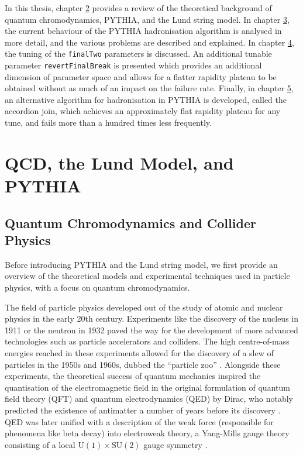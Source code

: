 \documentclass[12pt,a4paper]{report}
\begin{document}
In this thesis, chapter \hyperref[chap:background]{2} provides a review of the theoretical background of quantum chromodynamics, PYTHIA, and the Lund string model. In chapter \hyperref[chap:fragmentation]{3}, the current behaviour of the PYTHIA hadronisation algorithm is analysed in more detail, and the various problems are described and explained. In chapter \hyperref[chap:tuning]{4}, the tuning of the \texttt{finalTwo} parameters is discussed. An additional tunable parameter \texttt{revertFinalBreak} is presented which provides an additional dimension of parameter space and allows for a flatter rapidity plateau to be obtained without as much of an impact on the failure rate. Finally, in chapter \hyperref[chap:accordion]{5}, an alternative algorithm for hadronisation in PYTHIA is developed, called the accordion join, which achieves an approximately flat rapidity plateau for any tune, and fails more than a hundred times less frequently.

\chapter{QCD, the Lund Model, and PYTHIA}
\label{chap:background}
\section{Quantum Chromodynamics and Collider Physics}
Before introducing PYTHIA and the Lund string model, we first provide an overview of the theoretical models and experimental techniques used in particle physics, with a focus on quantum chromodynamics.

The field of particle physics developed out of the study of atomic and nuclear physics in the early 20th century. Experiments like the discovery of the nucleus in 1911 \cite{rutherford_scattering_1911} or the neutron in 1932 \cite{chadwick_existence_1932} paved the way for the development of more advanced technologies such as particle accelerators and colliders. The high centre-of-mass energies reached in these experiments allowed for the discovery of a slew of particles in the 1950s and 1960s, dubbed the ``particle zoo'' \cite{Gross:2022hyw}. Alongside these experiments, the theoretical success of quantum mechanics inspired the quantisation of the electromagnetic field in the original formulation of quantum field theory (QFT) and quantum electrodynamics (QED) by Dirac, who notably predicted the existence of antimatter a number of years before its discovery \cite{dirac_quantum_1928,anderson_apparent_1932}. QED was later unified with a description of the weak force (responsible for phenomena like beta decay) into electroweak theory, a Yang-Mills gauge theory consisting of a local $\text{U}(1) \times \text{SU}(2)$ gauge symmetry \cite{navas_review_2024,thomson_modern_2013}.
\end{document}
